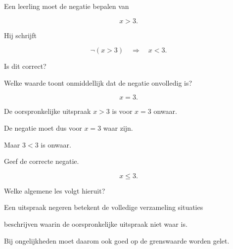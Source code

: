 \documentclass{ximera}
\begin{document}
\begin{oefening}{\oefU \ESS}

Een leerling moet de negatie bepalen van

\[
x>3.
\]

Hij schrijft

\[
\neg(x>3)
\quad\Longrightarrow\quad
x<3.
\]

\begin{question}

Is dit correct?

\begin{multipleChoice}



\end{multipleChoice}

\end{question}



\begin{question}

Welke waarde toont onmiddellijk dat de negatie onvolledig is?

\begin{oplossing}

\[
x=3.
\]

De oorspronkelijke uitspraak $x>3$ is voor $x=3$ onwaar.

De negatie moet dus voor $x=3$ waar zijn.

Maar $3<3$ is onwaar.

\end{oplossing}

\end{question}



\begin{question}

Geef de correcte negatie.

\begin{oplossing}

\[
x\leq3.
\]

\end{oplossing}

\end{question}



\begin{question}

Welke algemene les volgt hieruit?

\begin{oplossing}

Een uitspraak negeren betekent de volledige verzameling situaties

beschrijven waarin de oorspronkelijke uitspraak niet waar is.

Bij ongelijkheden moet daarom ook goed op de grenswaarde worden gelet.

\end{oplossing}

\end{question}

\end{oefening}
\end{document}
